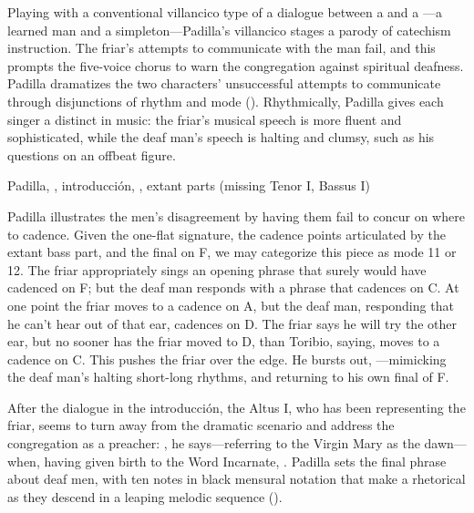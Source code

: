 Playing with a conventional villancico type of a dialogue between a 
 and a ---a learned man and a simpleton---Padilla's 
villancico stages a parody of catechism instruction.
The friar's attempts to communicate with the  man fail, and this 
prompts the five-voice chorus to warn the congregation against spiritual 
deafness.
Padilla dramatizes the two characters' unsuccessful attempts to communicate 
through disjunctions of rhythm and mode 
().
Rhythmically, Padilla gives each singer a distinct  in music: 
the friar's musical speech is more fluent and sophisticated, while the deaf 
man's speech is halting and clumsy, such as his questions  on 
an offbeat figure.

\begin{exmusic}
    \caption{Padilla, , introducción, 
    , extant parts (missing Tenor I, Bassus I)}
    \label{exmusic:Padilla-Sordo-intro}
\end{exmusic}

Padilla illustrates the men's disagreement by having them fail to concur on 
where to cadence.
Given the one-flat  signature, the cadence points 
articulated by the extant bass part, and the final on F, we may categorize this 
piece as mode 11 or 12.
The friar appropriately sings an opening phrase that surely would have cadenced 
on F; but the deaf man responds with a phrase that cadences on C.
At one point the friar moves to a cadence on A, but the deaf man, responding 
that he can't hear out of that ear, cadences on D.
The friar says he will try the other ear, but no sooner has the friar moved to 
D, than Toribio, saying,  moves to a 
cadence on C.
This pushes the friar over the edge.
He bursts out, ---mimicking the deaf man's 
halting short-long rhythms, and returning to his own final of F.

After the dialogue in the introducción, the Altus I, who has been representing 
the friar, seems to turn away from the dramatic scenario and address the 
congregation as a preacher: , he says---referring to the Virgin Mary as the dawn---when, having given 
birth to the Word Incarnate, .
Padilla sets the final phrase about deaf men, with ten notes in black mensural 
notation that make a rhetorical  as they descend in a leaping 
melodic sequence ().

